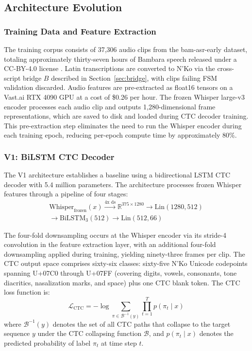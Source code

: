 \documentclass[11pt]{article}
\newcommand{\nko}{N'Ko}
\begin{document}
\subsection{Architecture Evolution}
\label{sec:architecture}

\subsubsection{Training Data and Feature Extraction}

The training corpus consists of 37,306 audio clips from the bam-asr-early dataset, totaling approximately thirty-seven hours of Bambara speech released under a CC-BY-4.0 license \cite{robotsmali2024}. Latin transcriptions are converted to \nko{} via the cross-script bridge $B$ described in Section~\ref{sec:bridge}, with clips failing FSM validation discarded. Audio features are pre-extracted as float16 tensors on a Vast.ai RTX 4090 GPU at a cost of \$0.26 per hour. The frozen Whisper large-v3 encoder processes each audio clip and outputs 1,280-dimensional frame representations, which are saved to disk and loaded during CTC decoder training. This pre-extraction step eliminates the need to run the Whisper encoder during each training epoch, reducing per-epoch compute time by approximately 80\%.

\subsubsection{V1: BiLSTM CTC Decoder}

The V1 architecture establishes a baseline using a bidirectional LSTM CTC decoder with 5.4 million parameters. The architecture processes frozen Whisper features through a pipeline of four stages:
\begin{multline}
\text{Whisper}_{\text{frozen}}(x) \xrightarrow{\text{4x ds}} \mathbb{R}^{375 \times 1280} \to \text{Lin}(1280, 512) \\
\to \text{BiLSTM}_3(512) \to \text{Lin}(512, 66)
\label{eq:v1}
\end{multline}

The four-fold downsampling occurs at the Whisper encoder via its stride-4 convolution in the feature extraction layer, with an additional four-fold downsampling applied during training, yielding ninety-three frames per clip. The CTC output space comprises sixty-six classes: sixty-five \nko{} Unicode codepoints spanning U+07C0 through U+07FF (covering digits, vowels, consonants, tone diacritics, nasalization marks, and space) plus one CTC blank token. The CTC loss function is:
\begin{equation}
\mathcal{L}_{\text{CTC}} = -\log \sum_{\pi \in \mathcal{B}^{-1}(y)} \prod_{t=1}^{T} p(\pi_t \mid x)
\label{eq:ctc}
\end{equation}
where $\mathcal{B}^{-1}(y)$ denotes the set of all CTC paths that collapse to the target sequence $y$ under the CTC collapsing function $\mathcal{B}$, and $p(\pi_t \mid x)$ denotes the predicted probability of label $\pi_t$ at time step $t$.
\end{document}
